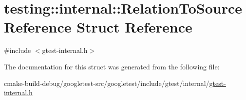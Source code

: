 \hypertarget{structtesting_1_1internal_1_1RelationToSourceReference}{}\section{testing\+::internal\+::Relation\+To\+Source\+Reference Struct Reference}
\label{structtesting_1_1internal_1_1RelationToSourceReference}


{\ttfamily \#include $<$gtest-\/internal.\+h$>$}



The documentation for this struct was generated from the following file\+:\begin{DoxyCompactItemize}
\item 
cmake-\/build-\/debug/googletest-\/src/googletest/include/gtest/internal/\mbox{\hyperlink{gtest-internal_8h}{gtest-\/internal.\+h}}\end{DoxyCompactItemize}
